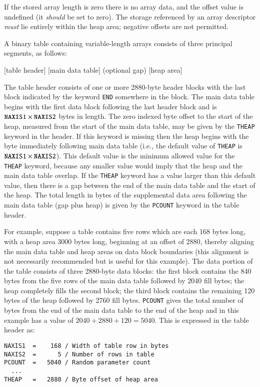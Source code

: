 \documentclass[onecolumn]{aa}
\begin{document}
If the stored array length is zero there is no array data, and the
offset value is undefined 
(it {\em should} be set to zero).  The storage
referenced by an array descriptor {\em must} lie entirely within the heap
area; negative offsets are not permitted.

A binary table containing variable-length arrays consists of three
principal segments, as follows:

\begin{center}
[table header] [main data table] (optional gap) [heap area]
\end{center}

The table header consists of one or more 2880-byte header blocks with the
last block indicated by the  keyword {\tt END} somewhere in
the block.  The main data table begins with the first data block
following the last header block and is $\mbox{\tt NAXIS1} \times
\mbox{\tt NAXIS2}$ bytes in length.   The
zero indexed byte offset to the start of the heap, measured
from the start of the main data table, may be given by the {\tt THEAP}
keyword in the header.   If this keyword is missing then the
heap begins with the byte immediately following main data table (i.e.,
the default value of  {\tt THEAP} is $\mbox{\tt NAXIS1} \times \mbox{\tt
NAXIS2}$). This default value is the minimum allowed value for the {\tt
THEAP} keyword, because any smaller value would imply that the heap and the main
data table overlap. If the {\tt THEAP} keyword has a value larger than
this default value, then there is a  gap between the end of the main data
table and the start of the heap.   The total length in bytes of the
supplemental data area following the main data table (gap plus heap) is
given by the {\tt PCOUNT} keyword in the table header.

For example, suppose a table contains five rows which are each 168 bytes
long, with a heap area 3000 bytes long, beginning at an offset of
2880, thereby aligning the main data table and heap areas on data
block boundaries (this alignment is not necessarily recommended but
is useful for this example).  The data portion of the table consists of
three 2880-byte data blocks:
the first block contains the 840 bytes from the five rows of the main data
table followed by 2040 fill bytes; the heap completely fills the second
block; the third block contains the remaining 120 bytes of the heap
followed by 2760 fill bytes. {\tt PCOUNT} gives the total number of
bytes from the end of the main data table to the end of the heap and in this
example has a value of $2040 + 2880 + 120 = 5040$.
This is expressed in the table header as:  
\begin{verbatim}
NAXIS1  =    168 / Width of table row in bytes
NAXIS2  =      5 / Number of rows in table
PCOUNT  =   5040 / Random parameter count
  ...
THEAP   =   2880 / Byte offset of heap area
\end{verbatim}
\end{document}
